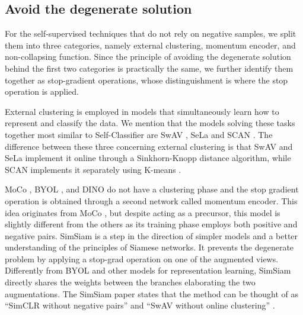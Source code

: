 \documentclass{article}
\begin{document}
\subsection{Avoid the degenerate solution}
\label{subsec:degenerate_solution}

For the self-supervised techniques that do not rely on negative samples, we split them into three categories, namely external clustering, momentum encoder, and non-collapsing function. Since the principle of avoiding the degenerate solution behind the first two categories is practically the same, we further identify them together as stop-gradient operations, whose distinguishment is where the stop operation is applied.

External clustering is employed in models that simultaneously learn how to represent and classify the data. We mention that the models solving these tasks together most similar to Self-Classifier are SwAV \cite{swav}, SeLa \cite{sela} and SCAN \cite{scan}. The difference between these three concerning external clustering is that SwAV and SeLa implement it online through a Sinkhorn-Knopp distance algorithm, while SCAN implements it separately using K-means \cite{self_classifier}. 

MoCo \cite{moco}, BYOL \cite{byol}, and DINO \cite{dino} do not have a clustering phase and the stop gradient operation is obtained through a second network called momentum encoder. This idea originates from MoCo \cite{moco}, but despite acting as a precursor, this model is slightly different from the others as its training phase employs both positive and negative pairs. SimSiam \cite{simsiam} is a step in the direction of simpler models and a better understanding of the principles of Siamese networks. It prevents the degenerate problem by applying a stop-grad operation on one of the augmented views. Differently from BYOL \cite{byol} and other models for representation learning, SimSiam directly shares the weights between the branches elaborating the two augmentations. The SimSiam paper states that the method can be thought of as “SimCLR without negative pairs” and “SwAV without online clustering” \cite{simsiam}.
\end{document}

